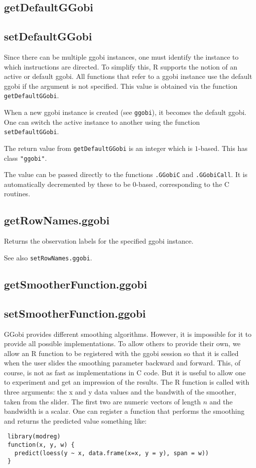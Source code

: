\documentclass{article}
\def\SFunction#1{{\texttt{\red #1}}}
\begin{document}
\subsection{getDefaultGGobi}
\subsection{setDefaultGGobi}
Since there can be multiple ggobi instances, one must identify the
instance to which instructions are directed.  To simplify this, R
supports the notion of an active or default ggobi.  All functions that
refer to a ggobi instance use the default ggobi if the 
argument is not specified.  This value is obtained via the function
\SFunction{getDefaultGGobi}.

When a new ggobi instance is created (see \SFunction{ggobi}), it
becomes the default ggobi.  One can switch the active instance to
another using the function \SFunction{setDefaultGGobi}.

The return value from \SFunction{getDefaultGGobi} is an integer which
is $1$-based.  This has class \texttt{"ggobi"}.

The value can be passed directly to the functions \SFunction{.GGobiC}
and \SFunction{.GGobiCall}.  It is automatically decremented by these
to be $0$-based, corresponding to the C routines.


\subsection{getRowNames.ggobi}
Returns the observation labels for the specified ggobi instance.

See also \SFunction{setRowNames.ggobi}.

\subsection{getSmootherFunction.ggobi}
\subsection{setSmootherFunction.ggobi}
GGobi provides different smoothing algorithms.  However, it is
impossible for it to provide all possible implementations.  To allow
others to provide their own, we allow an R function to be registered
with the ggobi session so that it is called when the user slides the
smoothing parameter backward and forward.  This, of course, is not as
fast as implementations in C code.  But it is useful to allow one to
experiment and get an impression of the results.
The R function is called with three arguments:
the x and y data values and the bandwith of the smoother,
taken from the slider. The first two are numeric vectors of length $n$
and the bandwidth is a scalar.
One can register a function that performs the 
smoothing and returns the predicted value something like:
\begin{verbatim}
 library(modreg)
 function(x, y, w) {
   predict(loess(y ~ x, data.frame(x=x, y = y), span = w))
 }
\end{verbatim}
\end{document}
